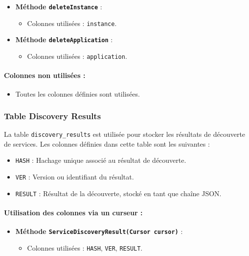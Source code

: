 \documentclass[a4paper,11pt]{article}
\begin{document}
\begin{itemize}
\begin{itemize}
    \end{itemize}
    \item \textbf{Méthode \texttt{deleteInstance}} :
    \begin{itemize}
        \item Colonnes utilisées : \texttt{instance}.
    \end{itemize}
    \item \textbf{Méthode \texttt{deleteApplication}} :
    \begin{itemize}
        \item Colonnes utilisées : \texttt{application}.
    \end{itemize}
\end{itemize}

\paragraph{Colonnes non utilisées :}
\begin{itemize}
    \item Toutes les colonnes définies sont utilisées.
\end{itemize}

\subsubsection*{Table Discovery Results}

La table \texttt{discovery\_results} est utilisée pour stocker les résultats de découverte de services. Les colonnes définies dans cette table sont les suivantes :

\begin{itemize}
    \item \texttt{HASH} : Hachage unique associé au résultat de découverte.
    \item \texttt{VER} : Version ou identifiant du résultat.
    \item \texttt{RESULT} : Résultat de la découverte, stocké en tant que chaîne JSON.
\end{itemize}

\paragraph{Utilisation des colonnes via un curseur :}
\begin{itemize}
    \item \textbf{Méthode \texttt{ServiceDiscoveryResult(Cursor cursor)}} :
    \begin{itemize}
        \item Colonnes utilisées : \texttt{HASH}, \texttt{VER}, \texttt{RESULT}.
    \end{itemize}
\end{itemize}
\end{document}
